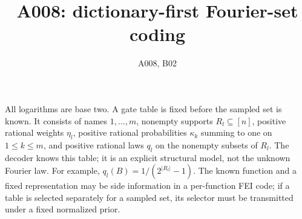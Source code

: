 \documentclass{article}
\begin{document}
\title{A008: dictionary-first Fourier-set coding}
\author{A008, B02}\maketitle
All logarithms are base two. A gate table is fixed before the sampled set is known. It consists of names $1,\ldots,m$, nonempty supports $R_l\subseteq[n]$, positive rational weights $\eta_l$, positive rational probabilities $\kappa_k$ summing to one on $1\le k\le m$, and positive rational laws $q_l$ on the nonempty subsets of $R_l$. The decoder knows this table; it is an explicit structural model, not the unknown Fourier law. For example, $q_l(B)=1/(2^{|R_l|}-1)$. The known function and a fixed representation may be side information in a per-function FEI code; if a table is selected separately for a sampled set, its selector must be transmitted under a fixed normalized prior.
\end{document}
